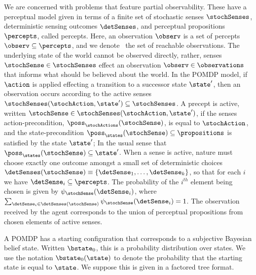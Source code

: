 \documentclass[letterpaper]{article}
\begin{document}
We are concerned with problems that feature partial
observability. These have a perceptual model given in terms of a
finite set of stochastic senses $\stochSenses$, deterministic sensing
outcomes $\detSenses$, and perceptual propositions $\percepts$, called
percepts. Here, an observation $\observ$ is a set of percepts $\observ
\subseteq \percepts$, and we denote \observations\ the set of
reachable observations. The underlying state of the world cannot be
observed directly, rather, senses $\stochSense \in \stochSenses$
effect an observation $\observ \in \observations$ that informs what
should be believed about the world. In the POMDP model, if $\action$
is applied effecting a transition to a successor state $\state'$, then
an observation occurs according to the active senses
$\stochSenses(\stochAction, \state') \subseteq \stochSenses$. A
precept is active, written $\stochSense \in \stochSenses(\stochAction,
\state')$, if the senses action-precondition,
$\poss_\stochActions(\stochSense)$, is equal to $\stochAction$, and
the state-precondition $\poss_\states(\stochSense) \subseteq
\propositions$ is satisfied by the state $\state'$; In the usual sense
that $\poss_\states(\stochSense) \subseteq \state'$.
When a sense is active, nature must choose exactly one outcome amongst
a small set of deterministic choices $\detSenses(\stochSense)
\equiv \{\detSense_1, \ldots, \detSense_k \}$, so that for each
$i$ we have $\detSense_i \subseteq \percepts$. The probability of
the $i^{th}$ element being chosen is given by
$\psi_{\stochSense}(\detSense_i)$, where $\sum_{\detSense_i \in
\detSenses(\stochSense)} \psi_{\stochSense}(\detSense_i) =
1$. The observation received by the agent corresponds to the union of
perceptual propositions from chosen elements of active senses.

A POMDP has a starting configuration that corresponds to a subjective
Bayesian belief state. Written $\bstate_0$, this is a probability
distribution over states. We use the notation $\bstate_0(\state)$ to
denote the probability that the starting state is equal to
$\state$. We suppose this is given in a factored tree format. 

\end{document}
